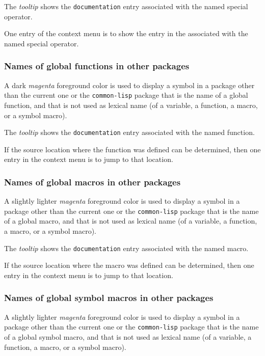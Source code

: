 The \emph{tooltip} shows the \texttt{documentation} entry associated
with the named special operator.

One entry of the context menu is to show the entry in the \hs{}
associated with the named special operator.

\subsubsection{Names of global functions in other packages}

A dark \emph{magenta} foreground color is used to display a symbol in
a package other than the current one or the \texttt{common-lisp}
package that is the name of a global function, and that is not used as
lexical name (of a variable, a function, a macro, or a symbol macro).

The \emph{tooltip} shows the \texttt{documentation} entry associated
with the named function.

If the source location where the function was defined can be
determined, then one entry in the context menu is to jump to that
location.

\subsubsection{Names of global macros in other packages}

A slightly lighter \emph{magenta} foreground color is used to display
a symbol in a package other than the current one or the
\texttt{common-lisp} package that is the name of a global macro, and
that is not used as lexical name (of a variable, a function, a macro,
or a symbol macro).

The \emph{tooltip} shows the \texttt{documentation} entry associated
with the named macro.

If the source location where the macro was defined can be determined,
then one entry in the context menu is to jump to that location.

\subsubsection{Names of global symbol macros in other packages}

A slightly lighter \emph{magenta} foreground color is used to display
a symbol in a package other than the current one or the
\texttt{common-lisp} package that is the name of a global symbol
macro, and that is not used as lexical name (of a variable, a
function, a macro, or a symbol macro).

